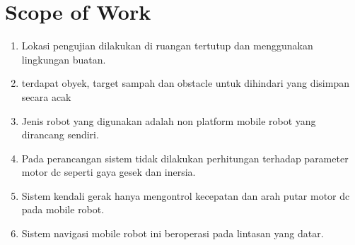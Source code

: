     
    
    
\section{Scope of Work}

\begin{enumerate}
	\item Lokasi pengujian dilakukan di ruangan tertutup dan menggunakan lingkungan buatan.
	\item terdapat obyek, target sampah dan obstacle untuk dihindari yang disimpan secara acak
	\item Jenis robot yang digunakan adalah non platform mobile robot yang dirancang sendiri.
	\item Pada perancangan sistem tidak dilakukan perhitungan terhadap parameter motor dc seperti gaya gesek dan inersia.
	\item Sistem kendali gerak hanya mengontrol kecepatan dan arah putar motor dc pada mobile robot.
	\item Sistem navigasi mobile robot ini beroperasi pada lintasan yang datar.
\end{enumerate}


